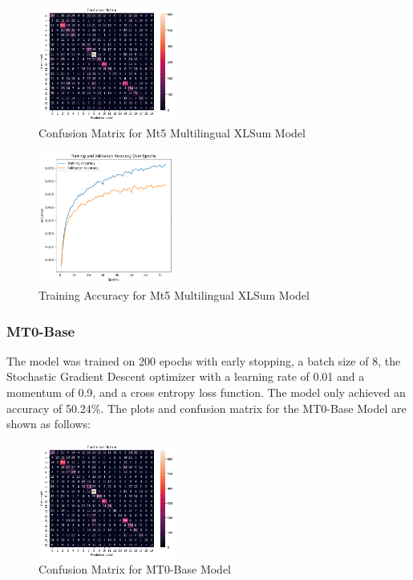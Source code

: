 \begin{figure}[H]
    \centering
    \includegraphics[width=0.4\textwidth]{mt5_confmat.png}
    \caption{Confusion Matrix for Mt5 Multilingual XLSum Model}
    \label{fig:mt5_confmat}
\end{figure}

\begin{figure}[H]
    \centering
    \includegraphics[width=0.4\textwidth]{mt5_trainaccuracy.png}
    \caption{Training Accuracy for Mt5 Multilingual XLSum Model}
    \label{fig:mt5_trainaccuracy}
\end{figure}


\subsubsection{MT0-Base}
The model was trained on 200 epochs with early stopping, a batch size of 8, the Stochastic Gradient Descent optimizer with a learning rate of 0.01 and a momentum of 0.9, and a cross entropy loss function. The model only achieved an accuracy of 50.24\%. The plots and confusion matrix for the MT0-Base Model are shown as follows:

\begin{figure}[H]
    \centering
    \includegraphics[width=0.4\textwidth]{mt0_confmat.png}
    \caption{Confusion Matrix for MT0-Base Model}
    \label{fig:mt0_confmat}
\end{figure}

